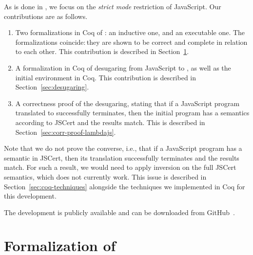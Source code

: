 \documentclass{llncs}
\begin{document}
As is done in \lambdajs, we focus on the \emph{strict mode} restriction of
JavaScript. Our contributions are as follows.
\begin{enumerate}
\item Two formalizations in Coq of \lambdajs: an inductive one, and an
  executable one. The formalizations coincide: they are shown to be correct and
  complete in relation to each other. This contribution is described in
  Section~\ref{sec:form-lambdajs}.
\item A formalization in Coq of desugaring from JavaScript to \lambdajs, as well
  as the initial \lambdajs environment in Coq. This contribution is described in
  Section~\ref{sec:desugaring}.
\item A correctness proof of the desugaring, stating that if a JavaScript
  program translated to \lambdajs successfully terminates, then the initial
  program has a semantics according to JSCert and the results match. This is
  described in Section~\ref{sec:corr-proof-lambdajs}.
\end{enumerate}

Note that we do not prove the converse, i.e., that if a JavaScript program has a
semantic in JSCert, then its \lambdajs translation successfully terminates and
the results match. For such a result, we would need to apply \textsf{inversion}
on the full JSCert semantics, which does not currently work. This issue is
described in Section~\ref{sec:coq-techniques} alongside the techniques we
implemented in Coq for this development.

The development is publicly available and can be downloaded from
GitHub~\cite{github:lambdacert}.

\section{Formalization of \lambdajs}
\label{sec:form-lambdajs}
\end{document}
